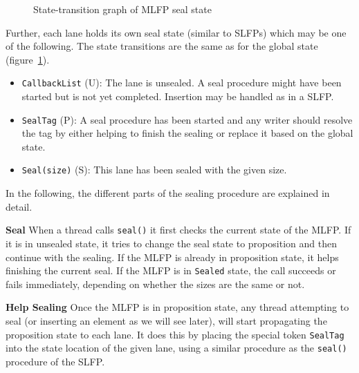 \documentclass[runningheads,a4paper,fleqn]{llncs}
\begin{document}
\begin{figure}
  \centering
  \caption{State-transition graph of MLFP seal state}
  \label{fig:seal-states}
\end{figure}

Further, each lane holds its own seal state (similar to SLFPs) which
may be one of the following. The state transitions are the same as for
the global state (figure~\ref{fig:seal-states}).
\begin{itemize}
\item \verb+CallbackList+ (U): The lane is unsealed. A seal procedure
  might have been started but is not yet completed. Insertion may be
  handled as in a SLFP.
\item \verb+SealTag+ (P): A seal procedure has been started and any
  writer should resolve the tag by either helping to finish the
  sealing or replace it based on the global state.
\item \verb+Seal(size)+ (S): This lane has been sealed with the given 
  size.
\end{itemize}

In the following, the different parts of the sealing procedure are
explained in detail.

\textbf{Seal} When a thread calls \verb+seal()+ it first checks the
current state of the MLFP. If it is in unsealed state, it tries to
change the seal state to proposition and then continue with the
sealing. If the MLFP is already in proposition state, it helps
finishing the current seal. If the MLFP is in \verb+Sealed+ state, the
call succeeds or fails immediately, depending on whether the sizes are
the same or not.

\textbf{Help Sealing} Once the MLFP is in proposition state, any
thread attempting to seal (or inserting an element as we will see
later), will start propagating the proposition state to each lane. It
does this by placing the special token \verb+SealTag+ into the state
location of the given lane, using a similar procedure as the
\verb+seal()+ procedure of the SLFP.
\end{document}
